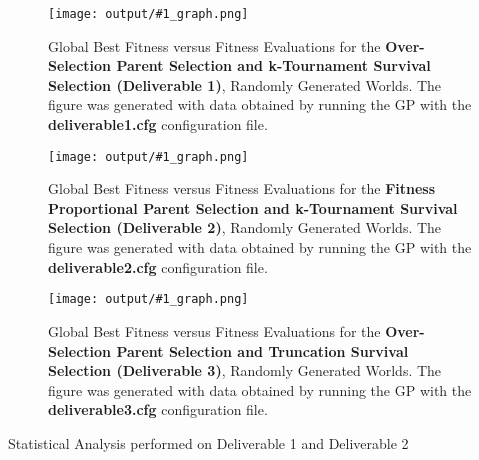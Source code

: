 \documentclass[11pt]{article}
\newcommand{\fitnessplotcaption}[2]{\caption{Global Best Fitness versus Fitness Evaluations for the \textbf{{#1}}, Randomly Generated Worlds. The figure was generated with data obtained by running the GP with the \textbf{{#2}} configuration file.}}
\newcommand{\addgraphic}[1]{\centerline{\texttt{[image: output/\#1\_graph.png]}}}
\newcommand{\tablecaption}[1]{\caption{Statistical Analysis performed on {#1}}}
\begin{document}
\begin{figure}[H]
    \addgraphic{deliverable1}
    \fitnessplotcaption{Over-Selection Parent Selection and  k-Tournament Survival Selection (Deliverable 1)}{deliverable1.cfg}
    \label{fig:deliverable1}
\end{figure}

\begin{figure}[H]
    \addgraphic{deliverable2}
    \fitnessplotcaption{Fitness Proportional Parent Selection and k-Tournament Survival Selection (Deliverable 2)}{deliverable2.cfg}
    \label{fig:deliverable2}
\end{figure}

\begin{figure}[H]
    \addgraphic{deliverable3}
    \fitnessplotcaption{Over-Selection Parent Selection and Truncation Survival Selection (Deliverable 3)}{deliverable3.cfg}
    \label{fig:deliverable3}
\end{figure}

\begin{table}[H] 
\tablecaption{Deliverable 1 and Deliverable 2}        
\label{d1_d2}                 
\end{table}
\end{document}
